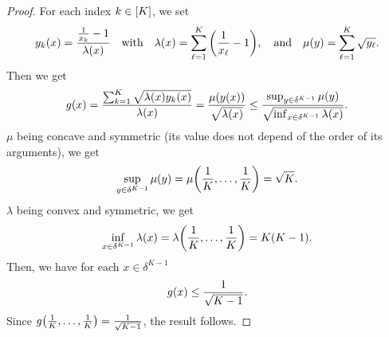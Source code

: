 \begin{proof}
For each index $k\in\range{K}$, we set
\begin{equation}
  y_k\bracket{x} = \frac{\frac{1}{x_k}-1}{\lambda\bracket{x}}
  \quad\mbox{with}\quad
  \lambda\bracket{x} = \sum_{\ell=1}^K\bracket{\frac{1}{x_{\ell}}-1}
  ,\quad\mbox{and}\quad 
  \mu\bracket{y} = \sum_{\ell=1}^K \sqrt{y_{\ell}}.
\end{equation}
Then we get
\begin{equation}
  g\bracket{x} = \frac{\sum_{k=1}^K\sqrt{\lambda\bracket{x}y_k\bracket{x}}}{\lambda\bracket{x}}
  = \frac{\mu\bracket{y\bracket{x}}}{\sqrt{\lambda\bracket{x}}}
  \le \frac{\sup_{y\in\delta^{K-1}}\mu\bracket{y}}{\sqrt{\inf_{x\in\delta^{K-1}}\lambda\bracket{x}}}.
\end{equation}
$\mu$ being concave and symmetric (\ie its value does not depend of the order of its arguments), we get
\begin{equation}
  \sup_{y\in\delta^{K-1}}\mu\bracket{y} = \mu\bracket{\frac{1}{K},\ldots,\frac{1}{K}} = \sqrt{K}.
\end{equation}
$\lambda$ being convex and symmetric, we get
\begin{equation}
  \inf_{x\in\delta^{K-1}}\lambda\bracket{x} = \lambda\bracket{\frac{1}{K},\ldots,\frac{1}{K}} = K\bracket{K-1}.
\end{equation}
Then, we have for each $x\in\delta^{K-1}$
\begin{equation}
  g\bracket{x} \le \frac{1}{\sqrt{K-1}}.
\end{equation}
Since $g\bracket{\frac{1}{K},\ldots,\frac{1}{K}}=\frac{1}{\sqrt{K-1}}$, the result follows.
\end{proof}

